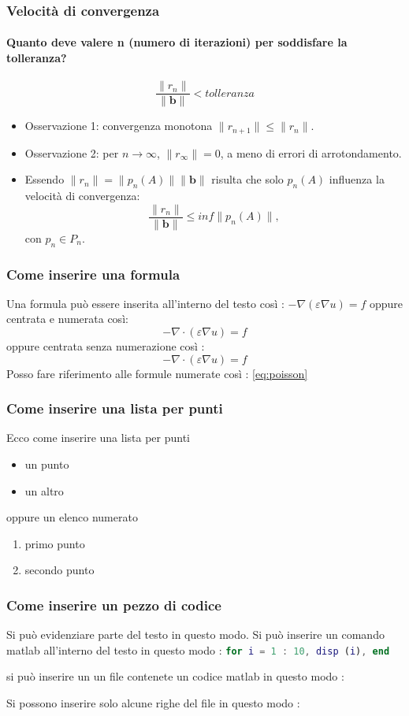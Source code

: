 \documentclass[10pt]{beamer}
\begin{document}
\begin{frame} \frametitle{Velocità di convergenza}\framesubtitle{Quanto deve valere \textbf{n} (numero di iterazioni) per soddisfare la tolleranza?}
    $$ \frac{\|r_n\|}{\|\mathbf{b}\|}  < tolleranza$$
\begin{itemize}
    \item Osservazione 1: convergenza monotona $\|r_{n+1}\|\leq \|r_n\|$.
    \item Osservazione 2: per $n\to \infty$, $\|r_{\infty} \|= 0$, a meno di errori di arrotondamento.
    
    \item Essendo $\|r_n\| = \|p_n(A)\|\|\mathbf{b}\|$ risulta che solo $p_n(A)$ influenza la velocità di convergenza: $$\frac{\|r_n\|}{\|\mathbf{b}\|} \leq inf\|p_n(A)\|,$$ con $p_n \in P_n$.

\end{itemize}
\end{frame}


\begin{frame} \frametitle{Come inserire una formula}
Una formula può essere inserita all'interno del testo così : 
$-\nabla \left( \varepsilon \nabla u \right) = f $ oppure 
centrata e numerata così:
\begin{equation}\label{eq:poisson}
    -\nabla \cdot \left( \varepsilon \nabla u \right) = f
\end{equation}
oppure centrata senza numerazione così :
$$
 -\nabla \cdot \left( \varepsilon \nabla u \right) = f
$$
Posso fare riferimento alle formule numerate così : \eqref{eq:poisson}
\end{frame}

\begin{frame} \frametitle{Come inserire una lista per punti}
Ecco come inserire una lista per punti
\begin{itemize}
    \item un punto
    \item un altro
\end{itemize}
oppure un elenco numerato
\begin{enumerate}
    \item primo punto
    \item secondo punto
\end{enumerate}

\end{frame}



\begin{frame} \frametitle{Come inserire un pezzo di codice}
Si può evidenziare \alert{parte del testo} in questo modo.
%
Si può inserire un comando matlab all'interno del testo
in questo modo : \lstinline[language=Matlab]{for i = 1 : 10, disp (i), end}

si può inserire un un file contenete un codice matlab in questo modo :


Si possono inserire solo alcune righe del file in questo modo :


\end{frame}
\end{document}
